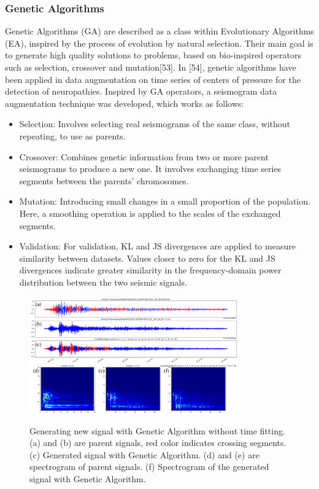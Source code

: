 \documentclass[journal]{IEEEtran}
\begin{document}
\subsubsection{Genetic Algorithms}
Genetic Algorithms (GA) are described as a class within Evolutionary Algorithms (EA), inspired by the process of evolution by natural selection. Their main goal is to generate high quality solutions to problems, based on bio-inspired operators such as selection, crossover and mutation[53]. In [54], genetic algorithms have been applied in data augmentation on time series of centers of pressure for the detection of neuropathies.
Inspired by GA operators, a seismogram data augmentation technique was developed, which works as follows:
\begin{itemize}
 \item Selection: Involves selecting real seismograms of the same class, without repeating, to use as parents.
 \item Crossover: Combines genetic information from two or more parent seismograms to produce a new one. It involves exchanging time series segments between the parents' chromosomes.
 \item Mutation: Introducing small changes in a small proportion of the population. Here, a smoothing operation is applied to the scales of the exchanged segments.
 \item Validation: For validation, KL and JS divergences are applied to measure similarity between datasets. Values closer to zero for the KL and JS divergences indicate greater similarity in the frequency-domain power distribution between the two seismic signals.
\end{itemize}
\begin{figure}
\centering
{\includegraphics[width=0.8\textwidth,keepaspectratio]{img/da_ag1.png}}
\caption{Generating new signal with Genetic Algorithm without time fitting. (a) and (b) are parent signals, red color indicates crossing segments. (c) Generated signal with Genetic Algorithm. (d) and (e) are spectrogram of parent signals. (f) Spectrogram of the generated signal with Genetic Algorithm.}
\label{fig:da_ga1}
\end{figure}
\end{document}
